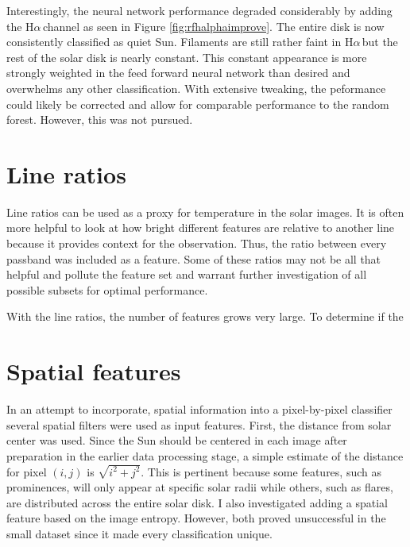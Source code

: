 \documentclass[twoside]{report}
\newcommand{\halpha}{H$\alpha$\,}
\begin{document}
Interestingly, the neural network performance degraded considerably by adding the \halpha channel as seen in Figure \ref{fig:rfhalphaimprove}. The entire disk is now consistently classified as quiet Sun. Filaments are still rather faint in \halpha but the rest of the solar disk is nearly constant. This constant appearance is more strongly weighted in the feed forward neural network than desired and overwhelms any other classification. With extensive tweaking, the peformance could likely be corrected and allow for comparable performance to the random forest. However, this was not pursued. 

\newpage 

\section{Line ratios}
Line ratios can be used as a proxy for temperature in the solar images. It is often more helpful to look at how bright different features are relative to another line because it provides context for the observation. Thus, the ratio between every passband was included as a feature. Some of these ratios may not be all that helpful and pollute the feature set and warrant further investigation of all possible subsets for optimal performance. 

With the line ratios, the number of features grows very large. To determine if the 

\newpage

\section{Spatial features}
In an attempt to incorporate, spatial information into a pixel-by-pixel classifier several spatial filters were used as input features. First, the distance from solar center was used. Since the Sun should be centered in each image after preparation in the earlier data processing stage, a simple estimate of the distance for pixel $(i,j)$ is $\sqrt{i^2 + j^2}$. This is pertinent because some features, such as prominences, will only appear at specific solar radii while others, such as flares, are distributed across the entire solar disk. I also investigated adding a spatial feature based on the image entropy. However, both proved unsuccessful in the small dataset since it made every classification unique. 
\end{document}
